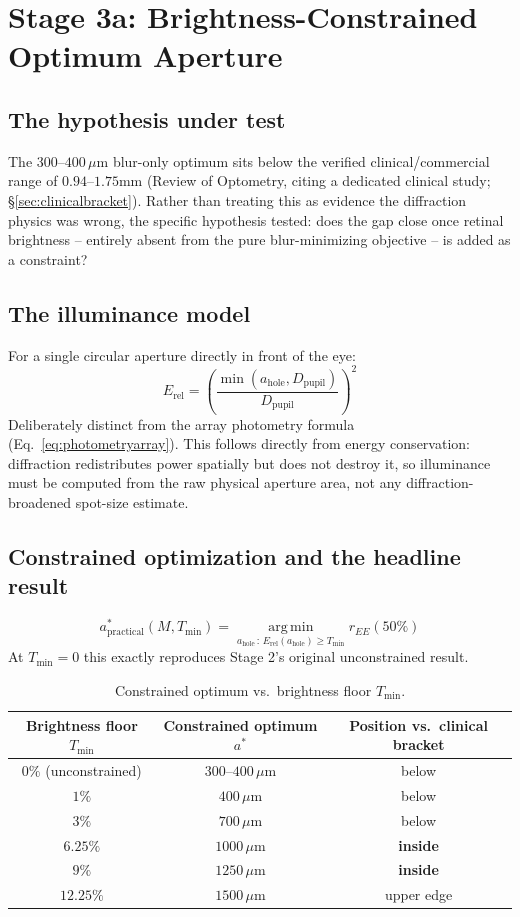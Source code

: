 \documentclass[11pt]{report}
\newcommand{\ahole}{a_{\text{hole}}}
\newcommand{\Dpupil}{D_{\text{pupil}}}
\newcommand{\Erel}{E_{\text{rel}}}
\newcommand{\Tmin}{T_{\min}}
\begin{document}
\chapter{Stage 3a: Brightness-Constrained Optimum Aperture}
\label{ch:stage3a}

\section{The hypothesis under test}
The $300$--$400\,\mu$m blur-only optimum sits below the verified clinical/commercial range of $0.94$--$1.75$mm (Review of Optometry, citing a dedicated clinical study; \S\ref{sec:clinicalbracket}). Rather than treating this as evidence the diffraction physics was wrong, the specific hypothesis tested: does the gap close once retinal brightness -- entirely absent from the pure blur-minimizing objective -- is added as a constraint?

\section{The illuminance model}
\label{sec:illuminancemodel}
For a single circular aperture directly in front of the eye:
\begin{equation}
\Erel = \left(\frac{\min(\ahole, \Dpupil)}{\Dpupil}\right)^2
\label{eq:erel}
\end{equation}
Deliberately distinct from the array photometry formula (Eq.~\ref{eq:photometryarray}). This follows directly from energy conservation: diffraction redistributes power spatially but does not destroy it, so illuminance must be computed from the raw physical aperture area, not any diffraction-broadened spot-size estimate.

\section{Constrained optimization and the headline result}
\label{sec:stage3aresult}
\begin{equation}
a^{*}_{\text{practical}}(M,\Tmin) = \operatorname*{arg\,min}_{\ahole\,:\,\Erel(\ahole)\ge\Tmin} r_{EE}(50\%)
\end{equation}
At $\Tmin=0$ this exactly reproduces Stage 2's original unconstrained result.

\begin{table}[h!]
\centering
\caption{Constrained optimum vs.\ brightness floor $\Tmin$.}
\label{tab:tminresult}
\begin{tabular}{ccc}
\toprule
Brightness floor $\Tmin$ & Constrained optimum $a^*$ & Position vs.\ clinical bracket \\
\midrule
$0\%$ (unconstrained) & $300$--$400\,\mu$m & below \\
$1\%$ & $400\,\mu$m & below \\
$3\%$ & $700\,\mu$m & below \\
$6.25\%$ & $1000\,\mu$m & \textbf{inside} \\
$9\%$ & $1250\,\mu$m & \textbf{inside} \\
$12.25\%$ & $1500\,\mu$m & upper edge \\
\bottomrule
\end{tabular}
\end{table}
\end{document}
